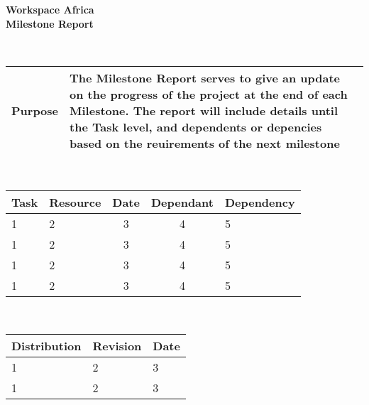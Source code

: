 \documentclass[a4paper,12pt]{article}
\date{07/09/2016}
\author{Preshane Pillay}
\begin{document}
   \centering
      \begin{Huge}
	{\bfseries Workspace Africa} \\
	{\bfseries Milestone Report} \\ 
      \end{Huge}
  
  \\[4cm]
      
      \begin{tabular}{|p{3cm}|p{10cm}|}
	\hline
	{\bfseries Purpose} & {The Milestone Report serves to give an update on the progress of the project at the end of each Milestone. The report will include details until the Task level, and dependents or depencies based on the reuirements of the next milestone}\\
	\hline
      \end{tabular}
      
  \\[4cm]
  
    \centering 
    \caption{Milestone Report}
      \begin{small}
	\begin{tabular}{||l|l|c|c|l||}
	  \hline
	 {\bfseries Task} & {\bfseries Resource} & {\bfseries Date} & {\bfseries Dependant} & {\bfseries Dependency} \\
	  \hline
       
	      1 & 2 & 3 & 4 & 5 \\
	  \hline
	      1 & 2 & 3 & 4 & 5 \\
	  \hline
	      1 & 2 & 3 & 4 & 5 \\
	  \hline
	      1 & 2 & 3 & 4 & 5 \\
	   \hline
	\end{tabular}
      \end{small}
      
      \\[4cm]

      \begin{tabular}{|p{5cm}|p{5cm}|p{2cm}|}
	\hline
	{\bfseries Distribution} & {\bfseries Revision} & {\bfseries Date} \\
	\hline
 
	     1 & 2 & 3 \\
	\hline
	     1 & 2 & 3 \\
	\hline
      \end{tabular}
\end{document}
